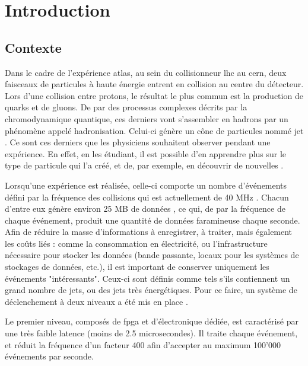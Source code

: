 \chapter{Introduction} %

\label{Introduction} %

\section{Contexte}

Dans le cadre de l'expérience \acrfull{atlas}, au sein du collisionneur \acrfull{lhc} au \acrfull{cern}, deux faisceaux de particules à haute énergie entrent en collision au centre du détecteur. Lors d'une collision entre protons, le résultat le plus commun est la production de quarks et de gluons. De par des processus complexes décrits par la chromodynamique quantique, ces derniers vont s'assembler en hadrons par un phénomène appelé hadronisation. Celui-ci génère un cône de particules nommé jet \cite{noauthor_jets_nodate}. Ce sont ces derniers que les physiciens souhaitent observer pendant une expérience. En effet, en les étudiant, il est possible d'en apprendre plus sur le type de particule qui l'a créé, et de, par exemple, en découvrir de nouvelles \cite{atlas_machine_2023}.

Lorsqu'une expérience est réalisée, celle-ci comporte un nombre d'événements défini par la fréquence des collisions qui est actuellement de 40 MHz \cite{noauthor_introduction_nodate}. Chacun d'entre eux génère environ 25 MB de données \cite{noauthor_trigger_nodate}, ce qui, de par la fréquence de chaque événement, produit une quantité de données faramineuse chaque seconde. Afin de réduire la masse d'informations à enregistrer, à traiter, mais également les coûts liés : comme la consommation en électricité, ou l'infrastructure nécessaire pour stocker les données (bande passante, locaux pour les systèmes de stockages de données, etc.), il est important de conserver uniquement les événements "intéressants". Ceux-ci sont définis comme tels s'ils contiennent un grand nombre de jets, ou des jets très énergétiques. Pour ce faire, un système de déclenchement à deux niveaux a été mis en place \cite{noauthor_trigger_nodate}.

Le premier niveau, composés de \acrfull{fpga} et d'électronique dédiée, est caractérisé par une très faible latence (moins de 2.5 microsecondes). Il traite chaque événement, et réduit la fréquence d'un facteur 400 afin d'accepter au maximum 100'000 événements par seconde.

